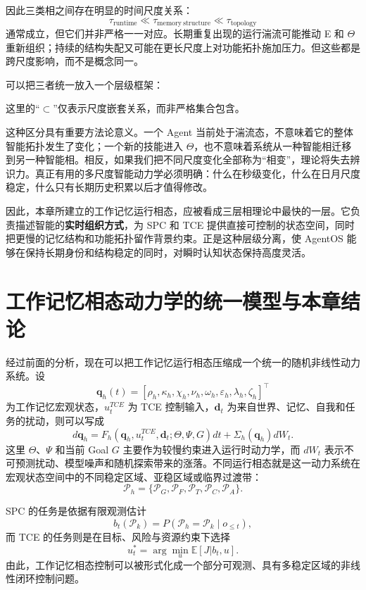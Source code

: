因此三类相之间存在明显的时间尺度关系：
\[
\tau_{\mathrm{runtime}}
\ll
\tau_{\mathrm{memory\ structure}}
\ll
\tau_{\mathrm{topology}}
\]
通常成立，但它们并非严格一一对应。长期重复出现的运行湍流可能推动 E 和 $\Theta$ 重新组织；持续的结构失配又可能在更长尺度上对功能拓扑施加压力。但这些都是跨尺度影响，而不是概念同一。

可以把三者统一放入一个层级框架：
\begin{statementbox}
\centering
{}
\end{statementbox}
这里的“$\subset$”仅表示尺度嵌套关系，而非严格集合包含。

这种区分具有重要方法论意义。一个 Agent 当前处于湍流态，不意味着它的整体智能拓扑发生了变化；一个新的技能进入 $\Theta$，也不意味着系统从一种智能相迁移到另一种智能相。相反，如果我们把不同尺度变化全部称为“相变”，理论将失去辨识力。真正有用的多尺度智能动力学必须明确：什么在秒级变化，什么在日月尺度稳定，什么只有长期历史积累以后才值得修改。

因此，本章所建立的工作记忆运行相态，应被看成三层相理论中最快的一层。它负责描述智能的\textbf{实时组织方式}，为 SPC 和 TCE 提供直接可控制的状态空间，同时把更慢的记忆结构和功能拓扑留作背景约束。正是这种层级分离，使 AgentOS 能够在保持长期身份和结构稳定的同时，对瞬时认知状态保持高度灵活。

\section{工作记忆相态动力学的统一模型与本章结论}

经过前面的分析，现在可以把工作记忆运行相态压缩成一个统一的随机非线性动力系统。设
\[
\mathbf q_h(t)
=
[
\rho_h,
\kappa_h,
\chi_h,
\nu_h,
\omega_h,
\varepsilon_h,
\lambda_h,
\zeta_h
]^\top
\]
为工作记忆宏观状态，$u_t^{TCE}$ 为 TCE 控制输入，$\mathbf d_t$ 为来自世界、记忆、自我和任务的扰动，则可以写成
\[
d\mathbf q_h
=
F_h(
\mathbf q_h,
u_t^{TCE},
\mathbf d_t;
\Theta,\Psi,G
)dt
+
\Sigma_h(\mathbf q_h)dW_t.
\]
这里 $\Theta$、$\Psi$ 和当前 Goal $G$ 主要作为较慢约束进入运行时动力学，而 $dW_t$ 表示不可预测扰动、模型噪声和随机探索带来的涨落。不同运行相态就是这一动力系统在宏观状态空间中的不同稳定区域、亚稳区域或临界过渡带：
\[
\mathcal P_h
=
\{
\mathcal P_G,
\mathcal P_F,
\mathcal P_T,
\mathcal P_C,
\mathcal P_A
\}.
\]

SPC 的任务是依据有限观测估计
\[
b_t(\mathcal P_k)
=
P(
\mathcal P_h=\mathcal P_k
\mid
o_{\leq t}
),
\]
而 TCE 的任务则是在目标、风险与资源约束下选择
\[
u_t^\ast
=
\arg\min_u
\mathbb E[J|b_t,u].
\]
由此，工作记忆相态控制可以被形式化成一个部分可观测、具有多稳定区域的非线性闭环控制问题。

